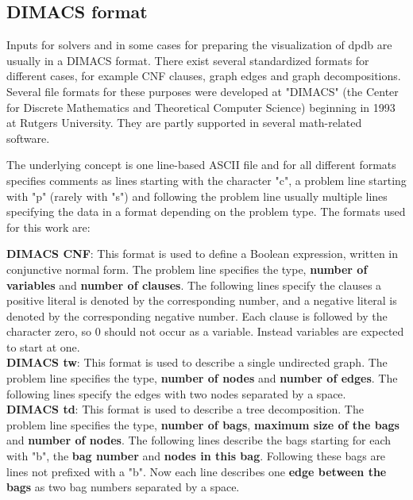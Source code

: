 \documentclass[a4paper, 12pt, bibliography=totoc]{scrartcl}
\begin{document}
\subsection{DIMACS format}

Inputs for solvers and in some cases for preparing the visualization of dpdb are usually in a DIMACS format. There exist several standardized formats for different cases, for example CNF clauses, graph edges and graph decompositions.
Several file formats for these purposes were developed at "DIMACS" (the Center for Discrete Mathematics and Theoretical Computer Science) \cite{dimacsimplcha} beginning in 1993 at Rutgers University.
They are partly supported in several math-related software.

The underlying concept is one line-based ASCII file and for all different formats specifies comments as lines starting with the character "c", a problem line starting with "p" (rarely with "s") and following the problem line usually multiple lines specifying the data in a format depending on the problem type.
The formats used for this work are:

\textbf{DIMACS CNF}: This format is used to define a Boolean expression, written in conjunctive normal form. The problem line specifies the type, \textbf{number of variables} and \textbf{number of clauses}. The following lines specify the clauses a positive literal is denoted by the corresponding number, and a negative literal is denoted by the corresponding negative number. Each clause is followed by the character zero, so 0 should not occur as a variable. Instead variables are expected to start at one.\\

\textbf{DIMACS tw}: This format is used to describe a single undirected graph. The problem line specifies the type, \textbf{number of nodes} and \textbf{number of edges}. The following lines specify the edges with two nodes separated by a space.\\

\textbf{DIMACS td}: This format is used to describe a tree decomposition. The problem line specifies the type, \textbf{number of bags}, \textbf{maximum size of the bags} and \textbf{number of nodes}. The following lines describe the bags starting for each with "b", the \textbf{bag number} and \textbf{nodes in this bag}. Following these bags are lines not prefixed with a "b". Now each line describes one \textbf{edge between the bags} as two bag numbers separated by a space.\\
\end{document}

